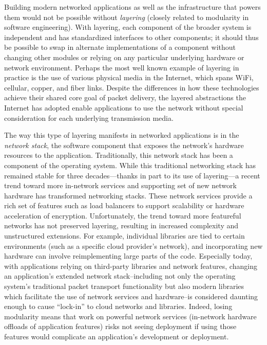 \noindent
Building modern networked applications as well as the infrastructure that powers them would not be possible without \emph{layering} (closely related to modularity in software engineering).
With layering, each component of the broader system is independent and has standardized interfaces to other components; it should thus be possible to swap in alternate implementations of a component without changing other modules or relying on any particular underlying hardware or network environment.
Perhaps the most well known example of layering in practice is the use of various physical media in the Internet, which spans WiFi, cellular, copper, and fiber links.
Despite the differences in how these technologies achieve their shared core goal of packet delivery, the layered abstractions the Internet has adopted enable applications to use the network without special consideration for each underlying transmission media.

The way this type of layering manifests in networked applications is in the \emph{network stack}, the software component that exposes the network's hardware resources to the application. Traditionally, this network stack has been a component of the operating system.
While this traditional networking stack has remained stable for three decades---thanks in part to its use of layering---a recent trend toward more in-network services and supporting set of new network hardware has transformed networking stacks. 
These network services provide a rich set of features such as load balancers to support scalability or hardware acceleration of encryption. 
Unfortunately, the trend toward more featureful networks has not preserved layering, resulting in increased complexity and unstructured extensions.
For example, individual libraries are tied to certain environments (such as a specific cloud provider's network), and incorporating new hardware can involve reimplementing large parts of the code. 
Especially today, with applications relying on third-party libraries and network features, changing an application's extended network stack--including not only the operating system's traditional packet transport functionality but also modern libraries which facilitate the use of network services and hardware--is considered daunting enough to cause ``lock-in'' to cloud networks and libraries.
Indeed, losing modularity means that work on powerful network services (\eg in-network hardware offloads of application features) risks not seeing deployment if using those features would complicate an application's development or deployment. 

